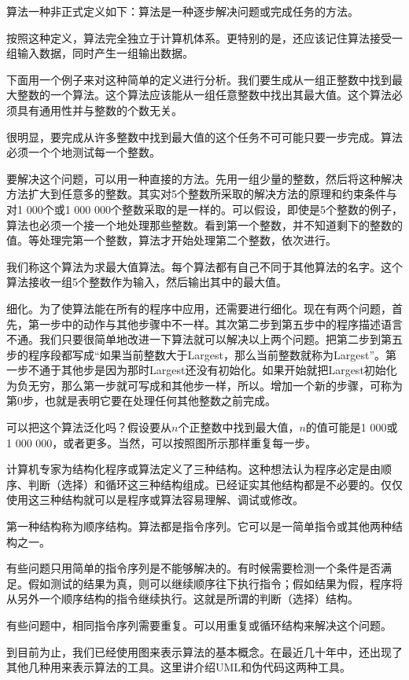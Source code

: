 
算法一种非正式定义如下：算法是一种逐步解决问题或完成任务的方法。

按照这种定义，算法完全独立于计算机体系。更特别的是，还应该记住算法接受一组输入数据，同时产生一组输出数据。

下面用一个例子来对这种简单的定义进行分析。我们要生成从一组正整数中找到最大整数的一个算法。这个算法应该能从一组任意整数中找出其最大值。这个算法必须具有通用性并与整数的个数无关。

很明显，要完成从许多整数中找到最大值的这个任务不可可能只要一步完成。算法必须一个个地测试每一个整数。

要解决这个问题，可以用一种直接的方法。先用一组少量的整数，然后将这种解决方法扩大到任意多的整数。其实对5个整数所采取的解决方法的原理和约束条件与对1 000个或1 000 000个整数采取的是一样的。可以假设，即使是5个整数的例子，算法也必须一个接一个地处理那些整数。看到第一个整数，并不知道剩下的整数的值。等处理完第一个整数，算法才开始处理第二个整数，依次进行。

我们称这个算法为求最大值算法。每个算法都有自己不同于其他算法的名字。这个算法接收一组5个整数作为输入，然后输出其中的最大值。

细化。为了使算法能在所有的程序中应用，还需要进行细化。现在有两个问题，首先，第一步中的动作与其他步骤中不一样。其次第二步到第五步中的程序描述语言不通。我们只要很简单地改进一下算法就可以解决以上两个问题。把第二步到第五步的程序段都写成“如果当前整数大于Largest，那么当前整数就称为Largest”。第一步不通于其他步是因为那时Largest还没有初始化。如果开始就把Largest初始化为负无穷，那么第一步就可写成和其他步一样，所以。增加一个新的步骤，可称为第0步，也就是表明它要在处理任何其他整数之前完成。

可以把这个算法泛化吗？假设要从$n$个正整数中找到最大值，$n$的值可能是1 000或1 000 000，或者更多。当然，可以按照图所示那样重复每一步。

计算机专家为结构化程序或算法定义了三种结构。这种想法认为程序必定是由顺序、判断（选择）和循环这三种结构组成。已经证实其他结构都是不必要的。仅仅使用这三种结构就可以是程序或算法容易理解、调试或修改。

第一种结构称为顺序结构。算法都是指令序列。它可以是一简单指令或其他两种结构之一。

有些问题只用简单的指令序列是不能够解决的。有时候需要检测一个条件是否满足。假如测试的结果为真，则可以继续顺序往下执行指令；假如结果为假，程序将从另外一个顺序结构的指令继续执行。这就是所谓的判断（选择）结构。

有些问题中，相同指令序列需要重复。可以用重复或循环结构来解决这个问题。

到目前为止，我们已经使用图来表示算法的基本概念。在最近几十年中，还出现了其他几种用来表示算法的工具。这里讲介绍UML和伪代码这两种工具。

